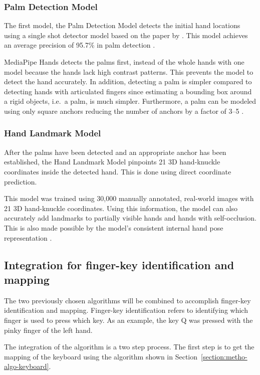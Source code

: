 \documentclass{report}
\begin{document}
\subsubsection{Palm Detection Model}
The first model, the Palm Detection Model detects the initial hand locations
using a single shot detector model based on the paper by \cite{ssd}. This model
achieves an average precision of 95.7\% in palm detection
\parencite{mediapipe-hands}.

MediaPipe Hands detects the palms first, instead of the whole hands with one
model because the hands lack high contrast patterns. This prevents the model to
detect the hand accurately. In addition, detecting a palm is simpler compared to
detecting hands with articulated fingers since estimating a bounding box around
a rigid objects, i.e.\ a palm, is much simpler. Furthermore, a palm can be
modeled using only square anchors reducing the number of anchors by a factor of
3--5 \parencite{mediapipe-hands}.

\subsubsection{Hand Landmark Model}
After the palms have been detected and an appropriate anchor has been
established, the Hand Landmark Model pinpoints 21 3D hand-knuckle coordinates
inside the detected hand. This is done using direct coordinate prediction.

This model was trained using 30,000 manually annotated, real-world images with
21 3D hand-knuckle coordinates. Using this information, the model can also
accurately add landmarks to partially visible hands and hands with
self-occlusion. This is also made possible by the model's consistent internal
hand pose representation \parencite{mediapipe-hands}.

\subsection{Integration for finger-key identification and mapping}

The two previously chosen algorithms will be combined to accomplish finger-key
identification and mapping. Finger-key identification refers to identifying
which finger is used to press which key. As an example, the key Q was pressed
with the pinky finger of the left hand.

The integration of the algorithm is a two step process. The first step is to get
the mapping of the keyboard using the algorithm shown in
Section~\ref{section:metho-algo-keyboard}.
\end{document}
